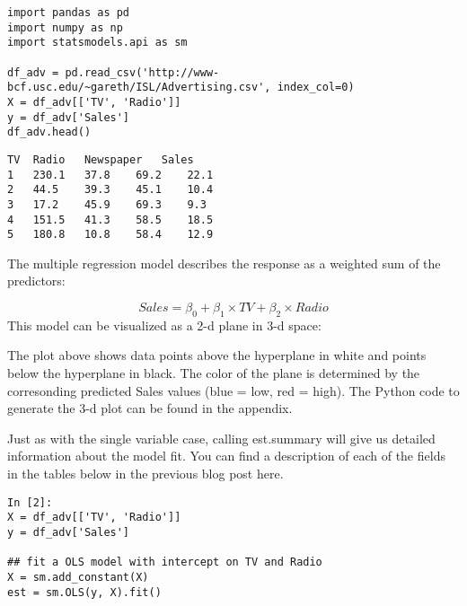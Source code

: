 \begin{frame}[fragile]
	\Large
\begin{framed}
\begin{verbatim}
import pandas as pd
import numpy as np
import statsmodels.api as sm

df_adv = pd.read_csv('http://www-bcf.usc.edu/~gareth/ISL/Advertising.csv', index_col=0)
X = df_adv[['TV', 'Radio']]
y = df_adv['Sales']
df_adv.head()
\end{verbatim}
\end{framed}
\end{frame}

\begin{frame}[fragile]
	\Large
\begin{framed}
	\begin{verbatim}
TV	Radio	Newspaper	Sales
1	230.1	37.8	69.2	22.1
2	44.5	39.3	45.1	10.4
3	17.2	45.9	69.3	9.3
4	151.5	41.3	58.5	18.5
5	180.8	10.8	58.4	12.9
\end{verbatim}
\end{framed}
The multiple regression model describes the response as a weighted sum of the predictors:

\[Sales=\beta_0+\beta_1\times TV+\beta_2\times Radio\]
This model can be visualized as a 2-d plane in 3-d space:
\end{frame}

\begin{frame}[fragile]
	\Large

The plot above shows data points above the hyperplane in white and points below the hyperplane in black. The color of the plane is determined by the corresonding predicted Sales values (blue = low, red = high). The Python code to generate the 3-d plot can be found in the appendix.
\end{frame}

\begin{frame}[fragile]
	\Large
Just as with the single variable case, calling est.summary will give us detailed information about the model fit. You can find a description of each of the fields in the tables below in the previous blog post here.
\end{frame}

\begin{frame}[fragile]
	\Large
\begin{framed}
	\begin{verbatim}
In [2]:
X = df_adv[['TV', 'Radio']]
y = df_adv['Sales']

## fit a OLS model with intercept on TV and Radio
X = sm.add_constant(X)
est = sm.OLS(y, X).fit()
\end{verbatim}
\end{framed}
\end{frame}


